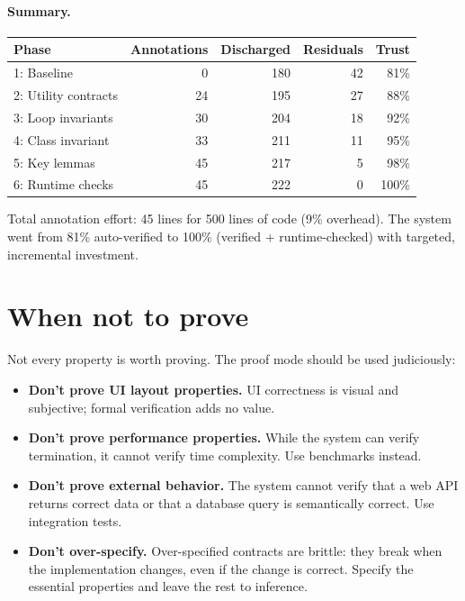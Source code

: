 \documentclass[11pt]{report}
\theoremstyle{definition}
\theoremstyle{plain}
\begin{document}
\paragraph{Summary.}
\begin{center}
\begin{tabular}{lrrrr}
\toprule
\textbf{Phase} & \textbf{Annotations} & \textbf{Discharged} &
  \textbf{Residuals} & \textbf{Trust} \\
\midrule
1: Baseline & 0 & 180 & 42 & 81\% \\
2: Utility contracts & 24 & 195 & 27 & 88\% \\
3: Loop invariants & 30 & 204 & 18 & 92\% \\
4: Class invariant & 33 & 211 & 11 & 95\% \\
5: Key lemmas & 45 & 217 & 5 & 98\% \\
6: Runtime checks & 45 & 222 & 0 & 100\% \\
\bottomrule
\end{tabular}
\end{center}

Total annotation effort: 45 lines for 500 lines of code (9\% overhead).
The system went from 81\% auto-verified to 100\% (verified + runtime-checked)
with targeted, incremental investment.

\section{When not to prove}

Not every property is worth proving. The proof mode should be used judiciously:

\begin{itemize}[nosep]
  \item \textbf{Don't prove UI layout properties.} UI correctness is visual
        and subjective; formal verification adds no value.
  \item \textbf{Don't prove performance properties.} While the system can
        verify termination, it cannot verify time complexity. Use benchmarks
        instead.
  \item \textbf{Don't prove external behavior.} The system cannot verify that
        a web API returns correct data or that a database query is
        semantically correct. Use integration tests.
  \item \textbf{Don't over-specify.} Over-specified contracts are brittle:
        they break when the implementation changes, even if the change is
        correct. Specify the essential properties and leave the rest to
        inference.
\end{itemize}
\end{document}
